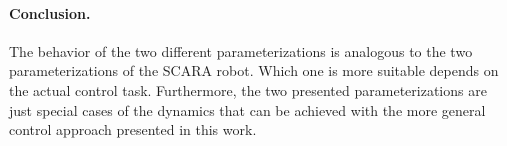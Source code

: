\paragraph*{Conclusion.}
The behavior of the two different parameterizations is analogous to the two parameterizations of the SCARA robot.
Which one is more suitable depends on the actual control task.
Furthermore, the two presented parameterizations are just special cases of the dynamics that can be achieved with the more general control approach presented in this work.

